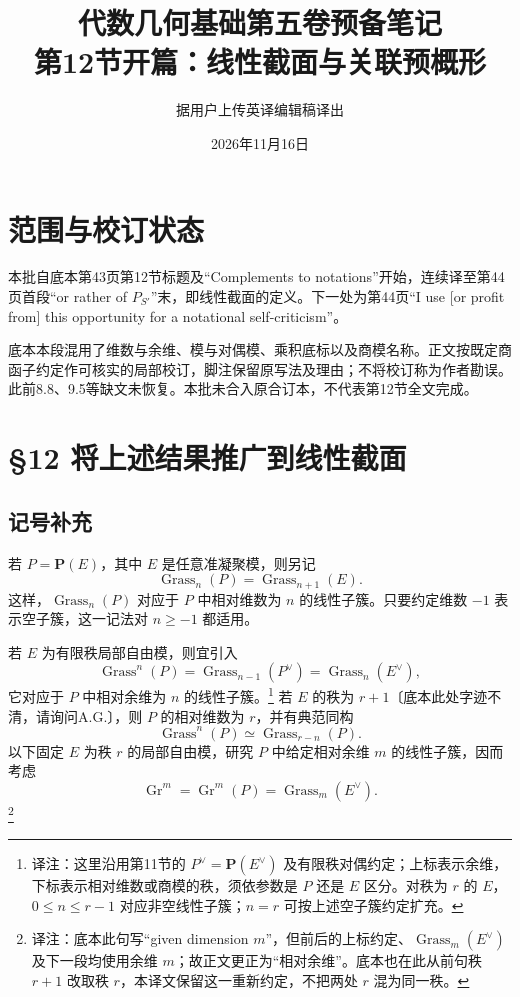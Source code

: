 \documentclass[openany,fontset=fandol]{ctexbook}
\title{代数几何基础第五卷预备笔记\\第12节开篇：线性截面与关联预概形}
\author{据用户上传英译编辑稿译出}
\date{2026年11月16日}
\newcommand{\note}[1]{\footnote{译注：#1}}
\begin{document}
\maketitle
\chapter*{范围与校订状态}
本批自底本第43页第12节标题及“Complements to notations”开始，连续译至第44页首段“or rather of $P_{S'}$”末，即线性截面的定义。下一处为第44页“I use [or profit from] this opportunity for a notational self-criticism”。

底本本段混用了维数与余维、模与对偶模、乘积底标以及商模名称。正文按既定商函子约定作可核实的局部校订，脚注保留原写法及理由；不将校订称为作者勘误。此前8.8、9.5等缺文未恢复。本批未合入原合订本，不代表第12节全文完成。
\chapter*{\S12 将上述结果推广到线性截面}
\section*{记号补充}
若 $P=\mathbf P(E)$，其中 $E$ 是任意准凝聚模，则另记
\[
\operatorname{Grass}_n(P)=\operatorname{Grass}_{n+1}(E).
\]
这样，$\operatorname{Grass}_n(P)$ 对应于 $P$ 中相对维数为 $n$ 的线性子簇。只要约定维数 $-1$ 表示空子簇，这一记法对 $n\geq-1$ 都适用。

若 $E$ 为有限秩局部自由模，则宜引入
\[
\operatorname{Grass}^{n}(P)
=\operatorname{Grass}_{n-1}(P^\vee)
=\operatorname{Grass}_{n}(E^\vee),
\]
它对应于 $P$ 中相对余维为 $n$ 的线性子簇。\note{这里沿用第11节的 $P^\vee=\mathbf P(E^\vee)$ 及有限秩对偶约定；上标表示余维，下标表示相对维数或商模的秩，须依参数是 $P$ 还是 $E$ 区分。对秩为 $r$ 的 $E$，$0\leq n\leq r-1$ 对应非空线性子簇；$n=r$ 可按上述空子簇约定扩充。}
若 $E$ 的秩为 $r+1$〔底本此处字迹不清，请询问A.G.〕，则 $P$ 的相对维数为 $r$，并有典范同构
\[
\operatorname{Grass}^{n}(P)\simeq\operatorname{Grass}_{r-n}(P).
\]
以下固定 $E$ 为秩 $r$ 的局部自由模，研究 $P$ 中给定相对余维 $m$ 的线性子簇，因而考虑
\[
\operatorname{Gr}^{m}=\operatorname{Gr}^{m}(P)
=\operatorname{Grass}_{m}(E^\vee).
\]
\note{底本此句写“given dimension $m$”，但前后的上标约定、$\operatorname{Grass}_m(E^\vee)$ 及下一段均使用余维 $m$；故正文更正为“相对余维”。底本也在此从前句秩 $r+1$ 改取秩 $r$，本译文保留这一重新约定，不把两处 $r$ 混为同一秩。}
\end{document}
